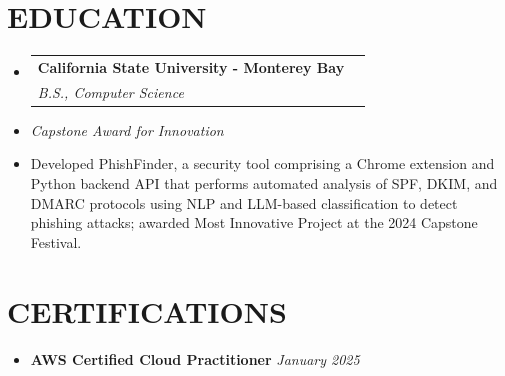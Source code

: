 \documentclass[letterpaper,10pt]{article}
\makeatletter
\newcommand{\resumeSubHeadingListStart}{\begin{itemize}[leftmargin=0in,label={}]}
\newcommand{\resumeSubHeadingListEnd}{\end{itemize}}
\newcommand{\resumeSubheading}[4]{%
  \vspace{-2pt}\item
  \begin{tabular*}{\textwidth}[t]{l@{\extracolsep{\fill}}r}
    \textbf{\large #1} & \textbf{\small #2} \\
    \textit{\large #3} & \textit{\small #4} \\
  \end{tabular*}\vspace{-2pt}
}
\makeatother
\begin{document}
\section{EDUCATION}
\vspace{8pt}
\resumeSubHeadingListStart
  \resumeSubheading
    {California State University - Monterey Bay}{}
    {B.S., Computer Science}{}
  \item {\small \textit{Capstone Award for Innovation }}
  \item {\small Developed PhishFinder, a security tool comprising a Chrome extension and Python backend API that performs automated analysis of SPF, DKIM, and DMARC protocols using NLP and LLM-based classification to detect phishing attacks; awarded Most Innovative Project at the 2024 Capstone Festival.}
\resumeSubHeadingListEnd
\vspace{6pt}


\section{CERTIFICATIONS}
\resumeSubHeadingListStart
\vspace{10pt}
\item {\small \textbf{AWS Certified Cloud Practitioner} \hfill \textit{January 2025}}
\resumeSubHeadingListEnd
\end{document}

